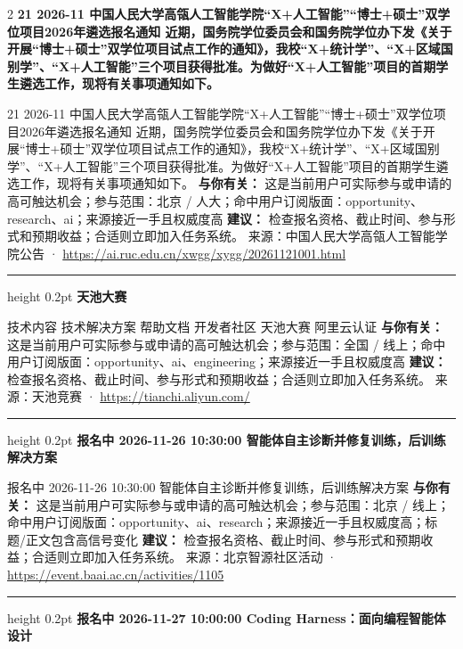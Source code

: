 \documentclass[10.5pt]{ctexart}
\begin{document}
\begin{multicols}{2}
{\large\bfseries 21 2026-11 中国人民大学高瓴人工智能学院“X+人工智能”“博士+硕士”双学位项目2026年遴选报名通知 近期，国务院学位委员会和国务院学位办下发《关于开展“博士+硕士”双学位项目试点工作的通知》，我校“X+统计学”、“X+区域国别学”、“X+人工智能”三个项目获得批准。为做好“X+人工智能”项目的首期学生遴选工作，现将有关事项通知如下。}\par
21 2026-11 中国人民大学高瓴人工智能学院“X+人工智能”“博士+硕士”双学位项目2026年遴选报名通知 近期，国务院学位委员会和国务院学位办下发《关于开展“博士+硕士”双学位项目试点工作的通知》，我校“X+统计学”、“X+区域国别学”、“X+人工智能”三个项目获得批准。为做好“X+人工智能”项目的首期学生遴选工作，现将有关事项通知如下。
\textbf{与你有关：} 这是当前用户可实际参与或申请的高可触达机会；参与范围：北京 / 人大；命中用户订阅版面：opportunity、research、ai；来源接近一手且权威度高
\textbf{建议：} 检查报名资格、截止时间、参与形式和预期收益；合适则立即加入任务系统。
{\footnotesize\color{ormuted} 来源：中国人民大学高瓴人工智能学院公告 · \url{https://ai.ruc.edu.cn/xwgg/xygg/20261121001.html}}
\vspace{2mm}
\hrule height 0.2pt
\vspace{2mm}
{\large\bfseries 天池大赛}\par
技术内容 技术解决方案 帮助文档 开发者社区 天池大赛 阿里云认证
\textbf{与你有关：} 这是当前用户可实际参与或申请的高可触达机会；参与范围：全国 / 线上；命中用户订阅版面：opportunity、ai、engineering；来源接近一手且权威度高
\textbf{建议：} 检查报名资格、截止时间、参与形式和预期收益；合适则立即加入任务系统。
{\footnotesize\color{ormuted} 来源：天池竞赛 · \url{https://tianchi.aliyun.com/}}
\vspace{2mm}
\hrule height 0.2pt
\vspace{2mm}
{\large\bfseries 报名中 2026-11-26 10:30:00 智能体自主诊断并修复训练，后训练解决方案}\par
报名中 2026-11-26 10:30:00 智能体自主诊断并修复训练，后训练解决方案
\textbf{与你有关：} 这是当前用户可实际参与或申请的高可触达机会；参与范围：北京 / 线上；命中用户订阅版面：opportunity、ai、research；来源接近一手且权威度高；标题/正文包含高信号变化
\textbf{建议：} 检查报名资格、截止时间、参与形式和预期收益；合适则立即加入任务系统。
{\footnotesize\color{ormuted} 来源：北京智源社区活动 · \url{https://event.baai.ac.cn/activities/1105}}
\vspace{2mm}
\hrule height 0.2pt
\vspace{2mm}
{\large\bfseries 报名中 2026-11-27 10:00:00 Coding Harness：面向编程智能体设计}\par

\end{multicols}
\end{document}
